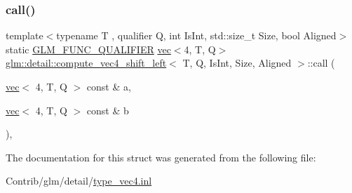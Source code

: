 \subsubsection{\texorpdfstring{call()}{call()}}
{\footnotesize\ttfamily template$<$typename T , qualifier Q, int Is\+Int, std\+::size\+\_\+t Size, bool Aligned$>$ \\
static \mbox{\hyperlink{setup_8hpp_a33fdea6f91c5f834105f7415e2a64407}{G\+L\+M\+\_\+\+F\+U\+N\+C\+\_\+\+Q\+U\+A\+L\+I\+F\+I\+ER}} \mbox{\hyperlink{structglm_1_1vec}{vec}}$<$4, T, Q$>$ \mbox{\hyperlink{structglm_1_1detail_1_1compute__vec4__shift__left}{glm\+::detail\+::compute\+\_\+vec4\+\_\+shift\+\_\+left}}$<$ T, Q, Is\+Int, Size, Aligned $>$\+::call (\begin{DoxyParamCaption}\item[{\mbox{\hyperlink{structglm_1_1vec}{vec}}$<$ 4, T, Q $>$ const \&}]{a,  }\item[{\mbox{\hyperlink{structglm_1_1vec}{vec}}$<$ 4, T, Q $>$ const \&}]{b }\end{DoxyParamCaption})\hspace{0.3cm}{\ttfamily [inline]}, {\ttfamily [static]}}



The documentation for this struct was generated from the following file\+:\begin{DoxyCompactItemize}
\item 
Contrib/glm/detail/\mbox{\hyperlink{type__vec4_8inl}{type\+\_\+vec4.\+inl}}\end{DoxyCompactItemize}
